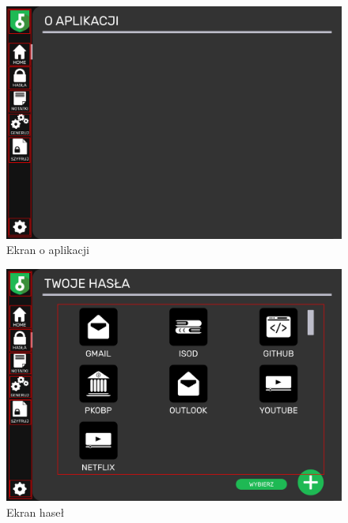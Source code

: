 \documentclass[a4paper]{article}
\begin{document}
\begin{figure}[H]
    \centering
    \includegraphics[width=1\textwidth]{img/ekarn_oapp.png}
    \caption{Ekran o aplikacji}
    \label{fig:oApp}
\end{figure}

\begin{figure}[H]
    \centering
    \includegraphics[width=1\textwidth]{img/ekran_hasel.png}
    \caption{Ekran haseł}
    \label{fig:hasla}
\end{figure}
\end{document}
